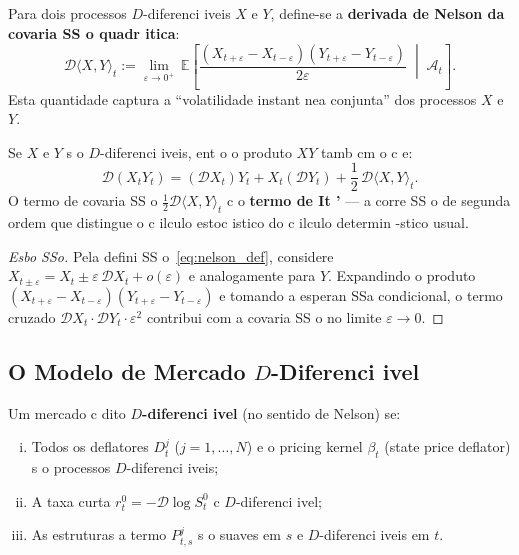 {\begin{defi}\label{def:nelson_covariation}
Para dois processos $D$-diferenci iveis $X$ e $Y$, define-se a
\textbf{derivada de Nelson da covaria SS o quadr itica}:
\begin{equation}\label{eq:nelson_covar}
 \mathcal{D}\langle X, Y\rangle_t
 := \lim_{\varepsilon \to 0^+}\,
 \mathbb{E}\!\left[
 \frac{(X_{t+\varepsilon} - X_{t-\varepsilon})
 (Y_{t+\varepsilon} - Y_{t-\varepsilon})}
 {2\varepsilon}
 \;\middle|\;
 \mathcal{A}_t
 \right].
\end{equation}
Esta quantidade captura a ``volatilidade instant nea conjunta'' dos
processos $X$ e $Y$.
\end{defi}

\begin{prop}
\label{prop:nelson_leibniz}
Se $X$ e $Y$ s o $D$-diferenci iveis, ent o o produto $XY$ tamb cm o c e:
\begin{equation}\label{eq:nelson_leibniz}
 \mathcal{D}(X_t Y_t) = (\mathcal{D}X_t) Y_t + X_t (\mathcal{D}Y_t)
 + \frac{1}{2}\,\mathcal{D}\langle X, Y\rangle_t.
\end{equation}
O termo de covaria SS o $\frac{1}{2}\mathcal{D}\langle X, Y\rangle_t$ c
o \textbf{termo de It '} --- a corre SS o de segunda ordem que distingue o
c ilculo estoc istico do c ilculo determin -stico usual.
\end{prop}

\begin{proof}[Esbo SSo]
Pela defini SS o~\eqref{eq:nelson_def}, considere $X_{t\pm\varepsilon} =
X_t \pm \varepsilon\,\mathcal{D}X_t + o(\varepsilon)$ e analogamente
para $Y$. Expandindo o produto $(X_{t+\varepsilon} - X_{t-\varepsilon})
(Y_{t+\varepsilon} - Y_{t-\varepsilon})$ e tomando a esperan SSa
condicional, o termo cruzado $\mathcal{D}X_t \cdot \mathcal{D}Y_t \cdot
\varepsilon^2$ contribui com a covaria SS o no limite $\varepsilon \to 0$.
\end{proof}

\subsection{O Modelo de Mercado $D$-Diferenci ivel}

\begin{defi}\label{def:D_diff_market}
Um mercado c dito \textbf{$D$-diferenci ivel} (no sentido de Nelson) se:
\begin{enumerate}[(i)]
 \item Todos os deflatores $D_t^j$ ($j = 1, \dots, N$) e o pricing
 kernel $\beta_t$ (state price deflator) s o processos
 $D$-diferenci iveis;
 \item A taxa curta $r_t^0 = -\mathcal{D}\log S_t^0$ c
 $D$-diferenci ivel;
 \item As estruturas a termo $P_{t,s}^j$ s o suaves em $s$ e
 $D$-diferenci iveis em $t$.
\end{enumerate}
\end{defi}

}
